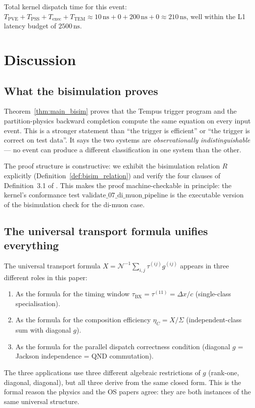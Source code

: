 \documentclass[twocolumn,10pt,a4paper]{article}
\theoremstyle{thmstyle}
\theoremstyle{definition}
\theoremstyle{remark}
\newcommand{\tBX}{\tau_{\mathrm{BX}}}
\newcommand{\etaC}{\eta_{C}}
\newcommand{\TP}{X}
\newcommand{\lag}{\tau}
\newcommand{\cpl}{g}
\begin{document}
Total kernel dispatch time for this event:
$T_{\mathrm{PVE}} + T_{\mathrm{PSS}} + T_{\mathrm{exec}} + T_{\mathrm{TEM}}
\approx 10\,\mathrm{ns} + 0 + 200\,\mathrm{ns} + 0 \approx 210\,\mathrm{ns}$,
well within the L1 latency budget of $2500\,\mathrm{ns}$.

\section{Discussion}
\label{sec:discussion}

\subsection{What the bisimulation proves}

Theorem~\ref{thm:main_bisim} proves that the Tempus trigger program and
the partition-physics backward completion compute the same equation on
every input event. This is a stronger statement than ``the trigger is
efficient'' or ``the trigger is correct on test data''. It says the two
systems are \emph{observationally indistinguishable} — no event can produce
a different classification in one system than the other.

The proof structure is constructive: we exhibit the bisimulation relation
$R$ explicitly (Definition~\ref{def:bisim_relation}) and verify the four
clauses of Definition~3.1 of \citet{companion:bisim}. This makes the proof
machine-checkable in principle: the kernel's conformance test
$\mathrm{validate\_07\_di\_muon\_pipeline}$ is the executable version of
the bisimulation check for the di-muon case.

\subsection{The universal transport formula unifies everything}

The universal transport formula $\TP = \mathcal{N}^{-1}\sum_{i,j}\lag^{(ij)}\cpl^{(ij)}$
\citep{companion:transport} appears in three different roles in this paper:
\begin{enumerate}[nosep]
\item As the formula for the timing window
  $\tBX = \lag^{(11)} = \Delta x/c$ (single-class specialisation).
\item As the formula for the composition efficiency
  $\etaC = \TP/\Sigma$ (independent-class sum with diagonal $\cpl$).
\item As the formula for the parallel dispatch correctness condition
  (diagonal $\cpl$ = Jackson independence = QND commutation).
\end{enumerate}
The three applications use three different algebraic restrictions of $\cpl$
(rank-one, diagonal, diagonal), but all three derive from the same closed
form. This is the formal reason the physics and the OS papers agree: they
are both instances of the same universal structure.
\end{document}
